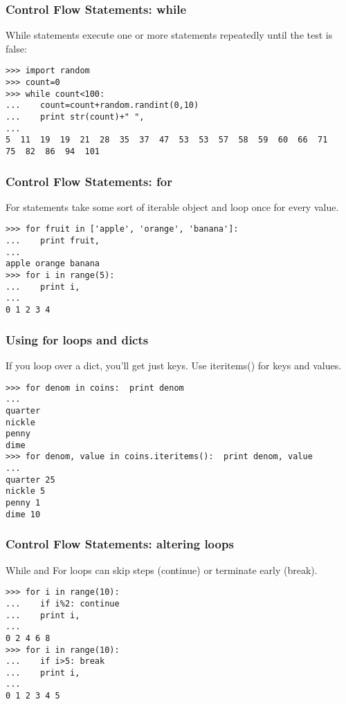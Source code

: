 \documentclass[10pt]{beamer}
\newcommand\smallfont{\fontsize{8pt}{7.2}\selectfont}
\begin{document}
\begin{frame}[fragile]
\frametitle{Control Flow Statements: while}

While statements execute one or more statements repeatedly until the 
test is false:

\begin{verbatim}
>>> import random
>>> count=0
>>> while count<100:
...    count=count+random.randint(0,10)
...    print str(count)+" ",
... 
5  11  19  19  21  28  35  37  47  53  53  57  58  59  60  66  71  
75  82  86  94  101 
\end{verbatim}

\end{frame}


\begin{frame}[fragile]
\frametitle{Control Flow Statements: for}

For statements take some sort of iterable object and loop once for 
every value.

\begin{verbatim}
>>> for fruit in ['apple', 'orange', 'banana']:
...    print fruit, 
... 
apple orange banana
>>> for i in range(5):
...    print i,
... 
0 1 2 3 4 

\end{verbatim}

\end{frame}

\begin{frame}[fragile]
\frametitle{Using for loops and dicts}
If you loop over a dict, you'll get just keys.  Use iteritems() for keys and values.

\smallfont
\begin{verbatim}
>>> for denom in coins:  print denom
... 
quarter
nickle
penny
dime
>>> for denom, value in coins.iteritems():  print denom, value
... 
quarter 25
nickle 5
penny 1
dime 10

\end{verbatim}
\end{frame}


\begin{frame}[fragile]
\frametitle{Control Flow Statements: altering loops}

While and For loops can skip steps (continue) or terminate early (break).

\begin{verbatim}
>>> for i in range(10):
...    if i%2: continue
...    print i, 
... 
0 2 4 6 8
>>> for i in range(10):
...    if i>5: break
...    print i,
... 
0 1 2 3 4 5
\end{verbatim}

\end{frame}
\end{document}
